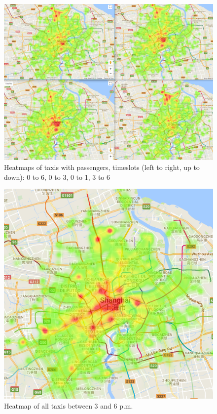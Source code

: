 \documentclass[11pt,conference,a4paper,twocolumns,romanappendices]{IEEEtran}
\begin{document}
\begin{figure}[h]
\centering
\includegraphics[scale=0.25]{../images/multiple_heatmaps_pass.PNG}
\caption{\label{fig:multiple heatmaps}Heatmaps of taxis with passengers, timeslots (left to right, up to down): 0 to 6, 0 to 3, 0 to 1, 3 to 6 }
\end{figure}

\begin{figure}[h]
\centering
\includegraphics[scale=0.45]{15to18.png}
\caption{\label{fig:h15to18}Heatmap of all taxis between 3 and 6 p.m.}
\end{figure}
\end{document}
